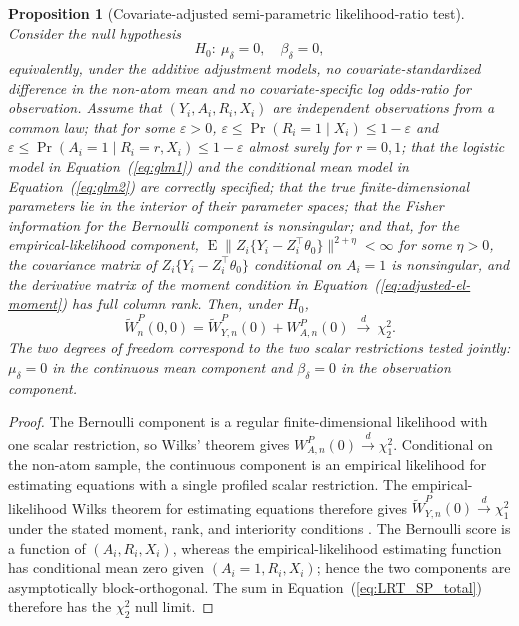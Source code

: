 \documentclass[11pt]{article}
\DeclareMathOperator*{\E}{E}
\newtheorem{proposition}{Proposition}
\begin{document}
\begin{proposition}[Covariate-adjusted semi-parametric likelihood-ratio test]\label{prop:covariate-adjusted-splrt}
Consider the null hypothesis
\[
  H_0:\ \mu_\delta = 0,\quad \beta_\delta = 0,
\]
equivalently, under the additive adjustment models, no covariate-standardized difference in the non-atom mean and no covariate-specific log odds-ratio for observation. Assume that $(Y_i,A_i,R_i,X_i)$ are independent observations from a common law; that for some $\varepsilon>0$, $\varepsilon \leq \Pr(R_i=1\mid X_i) \leq 1-\varepsilon$ and $\varepsilon \leq \Pr(A_i=1\mid R_i=r,X_i) \leq 1-\varepsilon$ almost surely for $r=0,1$; that the logistic model in Equation~(\ref{eq:glm1}) and the conditional mean model in Equation~(\ref{eq:glm2}) are correctly specified; that the true finite-dimensional parameters lie in the interior of their parameter spaces; that the Fisher information for the Bernoulli component is nonsingular; and that, for the empirical-likelihood component, $\E\|Z_i\{Y_i-Z_i^\top\theta_0\}\|^{2+\eta}<\infty$ for some $\eta>0$, the covariance matrix of $Z_i\{Y_i-Z_i^\top\theta_0\}$ conditional on $A_i=1$ is nonsingular, and the derivative matrix of the moment condition in Equation~(\ref{eq:adjusted-el-moment}) has full column rank. Then, under $H_0$,
\[
  \widetilde{W}_n^P(0,0)
  =
  \widetilde{W}_{Y,n}^P(0)+W_{A,n}^P(0)
  \ \overset{d}{\longrightarrow}\ \chi^2_2.
\]
The two degrees of freedom correspond to the two scalar restrictions tested jointly: $\mu_\delta=0$ in the continuous mean component and $\beta_\delta=0$ in the observation component.
\end{proposition}

\begin{proof}
The Bernoulli component is a regular finite-dimensional likelihood with one scalar restriction, so Wilks' theorem gives $W_{A,n}^P(0)\overset{d}{\to}\chi^2_1$. Conditional on the non-atom sample, the continuous component is an empirical likelihood for estimating equations with a single profiled scalar restriction. The empirical-likelihood Wilks theorem for estimating equations therefore gives $\widetilde{W}_{Y,n}^P(0)\overset{d}{\to}\chi^2_1$ under the stated moment, rank, and interiority conditions \citep{owen1991empirical,qin1994empirical}. The Bernoulli score is a function of $(A_i,R_i,X_i)$, whereas the empirical-likelihood estimating function has conditional mean zero given $(A_i=1,R_i,X_i)$; hence the two components are asymptotically block-orthogonal. The sum in Equation~(\ref{eq:LRT_SP_total}) therefore has the $\chi^2_2$ null limit.
\end{proof}
\end{document}
